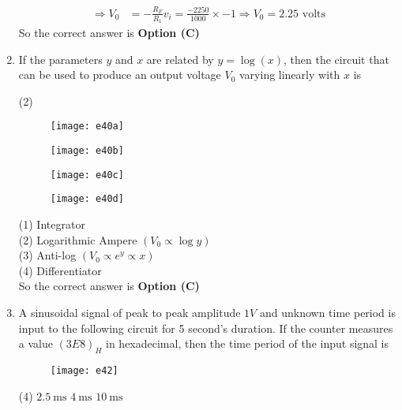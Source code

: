 \begin{enumerate}
\begin{answer}
\begin{align*}
	\Rightarrow V_{0}&=-\frac{R_{F}}{R_{1}} v_{i}=\frac{-2250}{1000} \times-1 \Rightarrow V_{0}=2.25\text{ volts}
	\end{align*}
	So the correct answer is \textbf{Option (C)}
\end{answer}
	\item If the parameters $y$ and $x$ are related by $y=\log (x)$, then the circuit that can be used to produce an output voltage $V_{0}$ varying linearly with $x$ is
	{}
	\begin{tasks}(2)
		\task[\textbf{A.}] \begin{figure}[H]
			\centering
			\texttt{[image: e40a]}
		\end{figure}
		\task[\textbf{B.}] \begin{figure}[H]
			\centering
			\texttt{[image: e40b]}
		\end{figure}
		\task[\textbf{C.}] \begin{figure}[H]
			\centering
			\texttt{[image: e40c]}
		\end{figure}
		\task[\textbf{D.}] \begin{figure}[H]
			\centering
			\texttt{[image: e40d]}
		\end{figure}
	\end{tasks}
\begin{answer}$\left. \right. $\\
	(1) Integrator\\
	(2) Logarithmic Ampere $\left(V_{0} \propto \log y\right)$\\
	(3) Anti-log $\left(V_{0} \propto e^{y} \propto x\right)$\\
	(4) Differentiator\\
	So the correct answer is \textbf{Option (C)}
\end{answer}
	\item A sinusoidal signal of peak to peak amplitude $1 V$ and unknown time period is input to the following circuit for 5 second's duration. If the counter measures a value $(3 E 8)_{H}$ in hexadecimal, then the time period of the input signal is
	{	}
	\begin{figure}[H]
		\centering
		\texttt{[image: e42]}
	\end{figure}
	\begin{tasks}(4)
		\task[\textbf{A.}] $2.5 \mathrm{~ms}$
		\task[\textbf{B.}] $4 \mathrm{~ms}$
		\task[\textbf{C.}]  $10 \mathrm{~ms}$

\end{tasks}
\end{enumerate}
